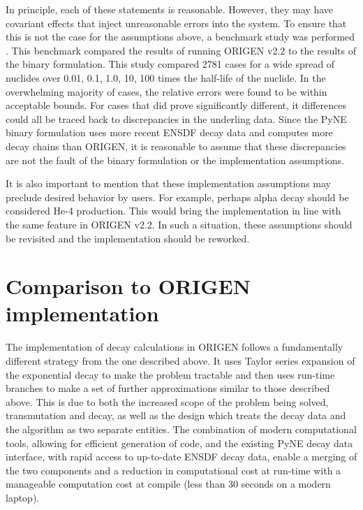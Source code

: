\documentclass{anstrans}
\begin{document}
In principle, each of these statements is reasonable. However, they may 
have covariant effects that inject unreasonable errors into the system.
To ensure that this is not the case for the assumptions above, 
a benchmark study was performed \cite{benchmark}. This benchmark compared
the results of running ORIGEN v2.2 \cite{croff1980origen2} to the results of 
the binary formulation. This study compared 2781 cases for a wide spread of
nuclides over 0.01, 0.1, 1.0, 10, 100 times the half-life of the nuclide.
In the overwhelming majority of cases, the relative errors were found to be 
within acceptable bounds.  For cases that did prove significantly different, 
it differences could all be traced back to discrepancies in the underling 
data. Since the PyNE binary formulation uses more recent ENSDF decay 
data \cite{bhat1992evaluated} and computes more decay chains than ORIGEN, 
it is reasonable to assume that these discrepancies are not the fault of the 
binary formulation or the implementation assumptions.

It is also important to mention that these implementation assumptions 
may preclude desired behavior by users. For example, perhaps alpha decay 
should be considered He-4 production. This would bring the implementation in
line with the same feature in ORIGEN v2.2. In such a situation, these 
assumptions should be revisited and the implementation should be reworked.

\section{Comparison to ORIGEN implementation}

The implementation of decay calculations in ORIGEN follows a fundamentally 
different strategy from the one described above. It uses Taylor series expansion 
of the exponential decay to make the problem tractable
and then uses run-time branches to make a set of further approximations similar
to those described above. This is due to both the increased scope of the 
problem being solved, transmutation and decay, as well as the design which
treats the decay data and the algorithm as two separate entities. The 
combination of modern computational tools, allowing for efficient generation of 
code, and the existing PyNE decay data interface, with rapid access to up-to-date ENSDF
decay data, enable a merging of the two components and a reduction in computational
cost at run-time with a manageable computation cost at compile (less than 30 seconds on
a modern laptop). 
\end{document}
